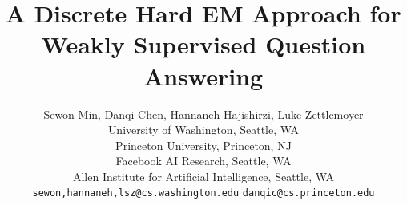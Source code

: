 \documentclass[11pt,a4paper]{article}
\title{
    A Discrete Hard EM Approach for \\
    Weakly Supervised Question Answering
}
\author{Sewon Min, Danqi Chen, Hannaneh Hajishirzi, Luke Zettlemoyer \\
University of Washington, Seattle, WA \\
Princeton University, Princeton, NJ \\
Facebook AI Research, Seattle, WA \\
Allen Institute for Artificial Intelligence, Seattle, WA \\
{\tt sewon,hannaneh,lsz@cs.washington.edu}
{\tt danqic@cs.princeton.edu}
}
\date{}
\begin{document}
\maketitle
\newcommand{\myabstract}{
    Many question answering (QA) tasks only provide weak supervision for how the answer should be computed. For example, \trivia\ answers are entities that can be mentioned multiple times in supporting documents, while \drop\ answers can be computed by deriving many different equations from numbers in the reference text.
    In this paper, we show it is possible to convert such tasks into discrete latent variable learning problems with a precomputed, task-specific set of possible {\em solutions} (e.g. different mentions or equations) that contains one correct option.
    We then develop a hard EM learning scheme that computes gradients relative to the most likely solution at each update. 
    Despite its simplicity, we show that this approach significantly outperforms previous methods on six QA tasks, including absolute gains of 2--10\%, and achieves the \sota\ on five of them.
    Using hard updates instead of maximizing marginal likelihood is key to these results as it encourages the model to find the one correct answer, which we show through detailed qualitative analysis.\footnote{Our code is publicly available at \url{https://github.com/shmsw25/qa-hard-em}.}
}

\newcommand{\dataurl}{\url{https://bit.ly/2HK1Fqn}}
\newcommand{\eg}{e.g.}
\newcommand{\discrete}{Reading comprehension with discrete reasoning}
\newcommand{\sota}{state-of-the-art}
\newcommand{\dev}{development}
\newcommand{\trivia}{\textsc{TriviaQA}}
\newcommand{\triviaopen}{\textsc{TriviaQA-open}}
\newcommand{\nqopen}{\textsc{NaturalQuestions-open}}
\newcommand{\narrative}{\textsc{NarrativeQA}}
\newcommand{\nq}{\textsc{Natural Questions}}
\newcommand{\drop}{\textsc{DROP}}
\newcommand{\wikisql}{\textsc{WikiSQL}}

\newcommand{\triviasize}{61,888 & 7,993 & 7,701}
\newcommand{\triviausize}{ 78,785 & 8,837 & 11,313}
\newcommand{\narrativesize}{32,747 & 3,461 & 10,557}
\newcommand{\nqsize}{79,168 & 8,757 & 3,610}
\newcommand{\dropsize}{ 46,973 & 5,850 & - }
\newcommand{\wikisqlsize}{ 56,355 & 8,421 & 15,878 }

\newcommand{\noname}{\textsc{}}
\newcommand{\ours}{Ours}
\newcommand{\triviafirstd}{48.6}
\newcommand{\triviammld}{47.0}
\newcommand{\triviaoursd}{50.7}
\newcommand{\nqfirstd}{23.6}
\newcommand{\nqmmld}{26.6}
\newcommand{\nqoursd}{28.8 }
\newcommand{\triviafirstt}{48.1}
\newcommand{\triviammlt}{47.4}
\newcommand{\triviaourst}{50.9}
\newcommand{\nqfirstt}{23.6}
\newcommand{\nqmmlt}{25.8}
\newcommand{\nqourst}{28.1}
\end{document}
